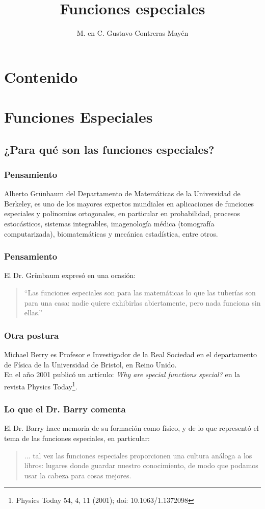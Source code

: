 \documentclass[12pt]{beamer}
\date{}
\title{Funciones especiales}
\author{M. en C. Gustavo Contreras Mayén}
\begin{document}
\maketitle
\fontsize{14}{14}\selectfont
{}

\section*{Contenido}

\section{Funciones Especiales}
\subsection{¿Para qué son las funciones especiales?}

\begin{frame}
\frametitle{Pensamiento}
Alberto Grünbaum del Departamento de Matemáticas de la Universidad de Berkeley, es uno de los mayores expertos mundiales en aplicaciones de funciones especiales y polinomios ortogonales, en particular en probabilidad, procesos estocásticos, sistemas integrables, imagenología médica (tomografía computarizada), biomatemáticas y mecánica estadística, entre otros.
\end{frame}
\begin{frame}
\frametitle{Pensamiento}
El Dr. Grünbaum expresó en una ocasión:
\\
\bigskip
\pause
\begin{quote}
\enquote{Las funciones especiales son para las matemáticas lo que las tuberías son para una casa: nadie quiere exhibirlas abiertamente, pero nada funciona sin ellas.}
\end{quote}
\end{frame}
\begin{frame}
\frametitle{Otra postura}
Michael Berry es Profesor e Investigador de la Real Sociedad en el departamento de Física de la Universidad de Bristol, en Reino Unido.
\\
\bigskip
\pause
En el año 2001 publicó un artículo: \emph{Why are special functions special?} en la revista Physics Today\footnote{Physics Today 54, 4, 11 (2001); doi: 10.1063/1.1372098}.
\end{frame}
\begin{frame}
\frametitle{Lo que el Dr. Barry comenta}
El Dr. Barry hace memoria de su formación como físico, y de lo que representó el tema de las funciones especiales, en particular:
\begin{quote}
 ... tal vez las funciones especiales proporcionen una cultura análoga a los libros: lugares donde guardar nuestro conocimiento, de modo que podamos usar la cabeza para cosas mejores.
\end{quote} 
\end{frame}
\end{document}
